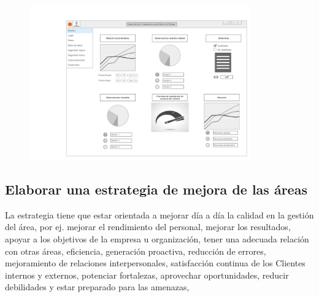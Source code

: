    \begin{figure}[h]
	  \centering
  	  \includegraphics[width=0.85\textwidth]{img/tp2_integrador/auditoria_externa}
      \label{Auditoría externa}
	\end{figure}
    
    \subsection{Elaborar una estrategia de mejora de las áreas}
    La estrategia tiene que estar orientada a mejorar día a día la calidad en la gestión del área, por ej. mejorar el rendimiento del personal, mejorar los resultados, apoyar a los objetivos de la empresa u organización, tener una adecuada relación con otras áreas,  eficiencia, generación proactiva, reducción de errores, mejoramiento de relaciones interpersonales, satisfacción continua de los Clientes internos y externos, potenciar fortalezas, aprovechar oportunidades, reducir debilidades y estar preparado para las amenazas, 

